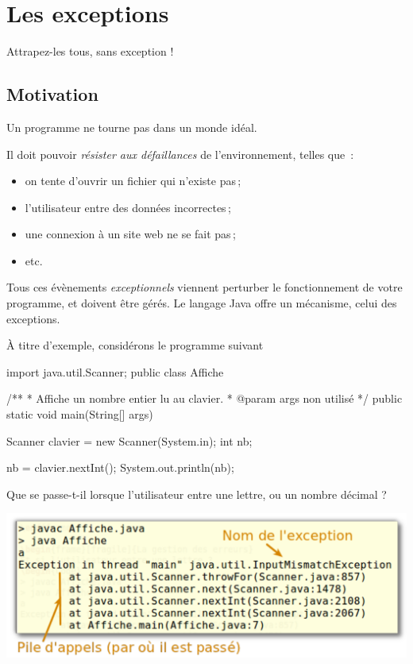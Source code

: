 \chapter{Les exceptions}
\label{chap:exceptions}

\begin{Exergue}
	\og{}Attrapez-les tous, sans exception !\fg{}
\end{Exergue}

\minitoc

\section{Motivation}
Un programme ne tourne pas dans un monde idéal.

Il doit pouvoir \emph{résister aux défaillances} de l'environnement, telles que~:
  \begin{itemize}
  \item on tente d'ouvrir un fichier qui n'existe pas\,;
  \item l'utilisateur entre des données incorrectes\,;
  \item une connexion à un site web ne se fait pas\,;
  \item etc.
  \end{itemize}

  Tous ces évènements \emph{exceptionnels} viennent perturber le fonctionnement de votre programme, et doivent être gérés. Le langage Java offre un mécanisme, celui des exceptions.

À titre d'exemple, considérons le programme suivant

\begin{java}
import java.util.Scanner;
public class Affiche {
  /**
   * Affiche un nombre entier lu au clavier.
   * @param args non utilisé
   */
  public static void main(String[] args) {
      Scanner clavier = new Scanner(System.in);
      int nb;
 
      nb = clavier.nextInt();
      System.out.println(nb);
  }
}
\end{java}

Que se passe-t-il lorsque l'utilisateur entre une lettre, ou un nombre décimal ?

\begin{center}
\includegraphics[scale=0.65]{images/exception-InputMismatchException.pdf}
\end{center}

